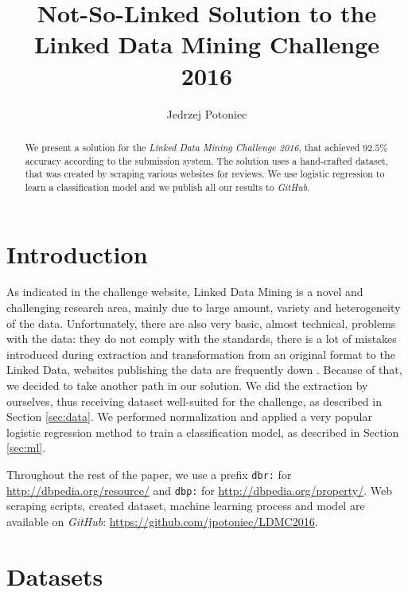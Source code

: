 \documentclass{llncs}
\begin{document}
\title{Not-So-Linked Solution to the Linked Data Mining Challenge 2016}
\author{Jedrzej Potoniec}

\maketitle

\begin{abstract}
We present a solution for the \emph{Linked Data Mining Challenge 2016}, that achieved $92.5\%$ accuracy according to the submission system.
The solution uses a hand-crafted dataset, that was created by scraping various websites for reviews.
We use logistic regression to learn a classification model and we publish all our results to \emph{GitHub}.
\end{abstract}


\section{Introduction}

As indicated in the challenge website, Linked Data Mining is a novel and challenging research area, mainly due to large amount, variety and heterogeneity of the data.
Unfortunately, there are also very basic, almost technical, problems with the data: they do not comply with the standards, there is a lot of mistakes introduced during extraction and transformation from an original format to the Linked Data, websites publishing the data are frequently down \cite{lodlaudromat}.
Because of that, we decided to take another path in our solution.
We did the extraction by ourselves, thus receiving dataset well-suited for the challenge, as described in Section \ref{sec:data}.
We performed normalization and applied a very popular logistic regression method to train a classification model, as described in Section \ref{sec:ml}.

Throughout the rest of the paper, we use a prefix \texttt{dbr:} for \url{http://dbpedia.org/resource/} and \texttt{dbp:} for \url{http://dbpedia.org/property/}.
Web scraping scripts, created dataset, machine learning process and model are available on \emph{GitHub}: \url{https://github.com/jpotoniec/LDMC2016}.

\section{Datasets\label{sec:data}}
\end{document}
